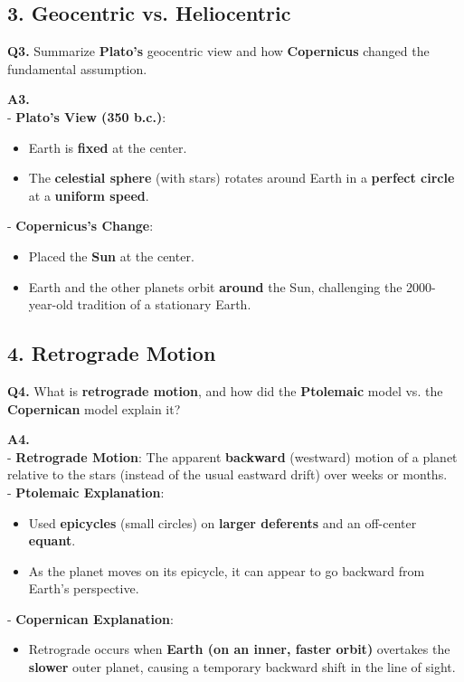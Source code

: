 \subsection*{3. Geocentric vs. Heliocentric}

\textbf{Q3.} Summarize \textbf{Plato’s} geocentric view and how \textbf{Copernicus} changed the fundamental assumption.

\textbf{A3.}\\
- \textbf{Plato’s View (350 b.c.)}:
  \begin{itemize}
    \item Earth is \textbf{fixed} at the center.
    \item The \textbf{celestial sphere} (with stars) rotates around Earth in a \textbf{perfect circle} at a \textbf{uniform speed}.
  \end{itemize}
- \textbf{Copernicus’s Change}:
  \begin{itemize}
    \item Placed the \textbf{Sun} at the center.
    \item Earth and the other planets orbit \textbf{around} the Sun, challenging the 2000-year-old tradition of a stationary Earth.
  \end{itemize}

\subsection*{4. Retrograde Motion}

\textbf{Q4.} What is \textbf{retrograde motion}, and how did the \textbf{Ptolemaic} model vs. the \textbf{Copernican} model explain it?

\textbf{A4.}\\
- \textbf{Retrograde Motion}: The apparent \textbf{backward} (westward) motion of a planet relative to the stars (instead of the usual eastward drift) over weeks or months.\\
- \textbf{Ptolemaic Explanation}:
  \begin{itemize}
    \item Used \textbf{epicycles} (small circles) on \textbf{larger deferents} and an off-center \textbf{equant}.
    \item As the planet moves on its epicycle, it can appear to go backward from Earth’s perspective.
  \end{itemize}
- \textbf{Copernican Explanation}:
  \begin{itemize}
    \item Retrograde occurs when \textbf{Earth (on an inner, faster orbit)} overtakes the \textbf{slower} outer planet, causing a temporary backward shift in the line of sight.
  \end{itemize}

